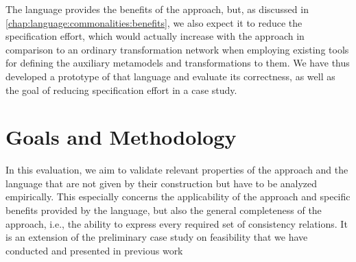 The \commonalities language provides the benefits of the \commonalities approach, but, as discussed in \autoref{chap:language:commonalities:benefits}, we also expect it to reduce the specification effort, which would actually increase with the \commonalities approach in comparison to an ordinary transformation network when employing existing tools for defining the auxiliary metamodels and transformations to them.
We have thus developed a prototype of that language and evaluate its correctness, as well as the goal of reducing specification effort in a case study.


\section{Goals and Methodology}

In this evaluation, we aim to validate relevant properties of the \commonalities approach and the \commonalities language that are not given by their construction but have to be analyzed empirically.
This especially concerns the applicability of the approach and specific benefits provided by the language, but also the general completeness of the approach, i.e., the ability to express every required set of consistency relations.
It is an extension of the preliminary case study on feasibility that we have conducted and presented in previous work~

